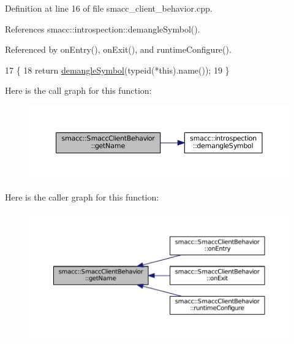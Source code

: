 Definition at line 16 of file smacc\+\_\+client\+\_\+behavior.\+cpp.



References smacc\+::introspection\+::demangle\+Symbol().



Referenced by on\+Entry(), on\+Exit(), and runtime\+Configure().


\begin{DoxyCode}
17 \{
18     \textcolor{keywordflow}{return} \hyperlink{namespacesmacc_1_1introspection_a2f495108db3e57604d8d3ff5ef030302}{demangleSymbol}(\textcolor{keyword}{typeid}(*this).name());
19 \}
\end{DoxyCode}


Here is the call graph for this function\+:
\nopagebreak
\begin{figure}[H]
\begin{center}
\leavevmode
\includegraphics[width=350pt]{classsmacc_1_1SmaccClientBehavior_a3bdd13bc7822f75bdb64a1f23bcf9d6c_cgraph}
\end{center}
\end{figure}




Here is the caller graph for this function\+:
\nopagebreak
\begin{figure}[H]
\begin{center}
\leavevmode
\includegraphics[width=350pt]{classsmacc_1_1SmaccClientBehavior_a3bdd13bc7822f75bdb64a1f23bcf9d6c_icgraph}
\end{center}
\end{figure}



